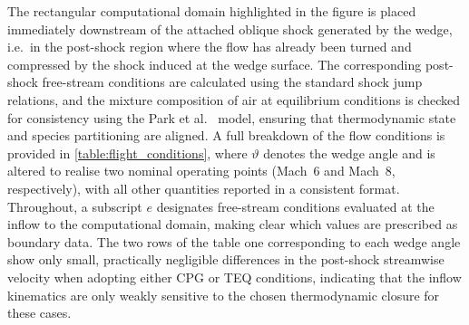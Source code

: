 The rectangular computational domain highlighted in the figure is placed immediately downstream of the attached oblique shock generated by the wedge, i.e.\ in the post-shock region where the flow has already been turned and compressed by the shock induced at the wedge surface. The corresponding post-shock free-stream conditions are calculated using the standard shock jump relations, and the mixture composition of air at equilibrium conditions is checked for consistency using the Park et al.~\cite{park2001} model, ensuring that thermodynamic state and species partitioning are aligned. A full breakdown of the flow conditions is provided in \cref{table:flight_conditions}, where $\vartheta$ denotes the wedge angle and is altered to realise two nominal operating points (Mach~6 and Mach~8, respectively), with all other quantities reported in a consistent format. Throughout, a subscript $e$ designates free-stream conditions evaluated at the inflow to the computational domain, making clear which values are prescribed as boundary data. The two rows of the table one corresponding to each wedge angle show only small, practically negligible differences in the post-shock streamwise velocity when adopting either \gls{CPG} or \gls{TEQ} conditions, indicating that the inflow kinematics are only weakly sensitive to the chosen thermodynamic closure for these cases.



